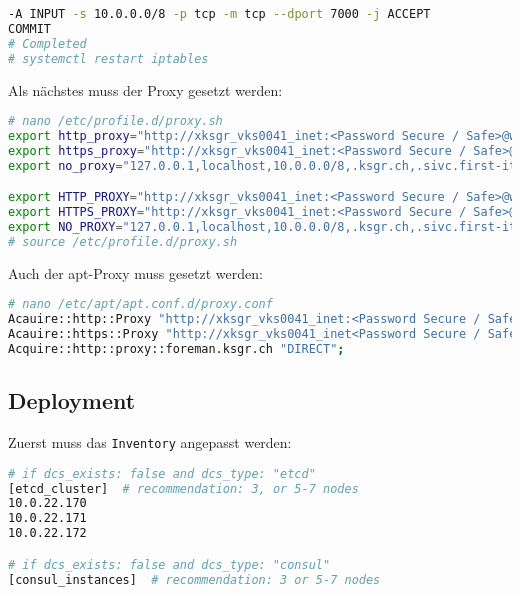 \begin{flushleft}
\begin{lstlisting}[language=bash, caption=Testsystem - Firewall Settings,captionpos=b,label={lst:testsystem-installation-firewall},breaklines=true]
-A INPUT -s 10.0.0.0/8 -p tcp -m tcp --dport 7000 -j ACCEPT
COMMIT
# Completed
# systemctl restart iptables
    \end{lstlisting}
    Als nächstes muss der Proxy gesetzt werden:
    \lstset{style=gra_codestyle}
    \begin{lstlisting}[language=bash, caption=Testsystem - Proxy Settings,captionpos=b,label={lst:testsystem-installation-proxy-settings},breaklines=true]
# nano /etc/profile.d/proxy.sh
export http_proxy="http://xksgr_vks0041_inet:<Password Secure / Safe>@webproxy.sivc.first-it.ch:9090";
export https_proxy="http://xksgr_vks0041_inet:<Password Secure / Safe>@webproxy.sivc.first-it.ch:9090";
export no_proxy="127.0.0.1,localhost,10.0.0.0/8,.ksgr.ch,.sivc.first-it.ch"

export HTTP_PROXY="http://xksgr_vks0041_inet:<Password Secure / Safe>@webproxy.sivc.first-it.ch:9090";
export HTTPS_PROXY="http://xksgr_vks0041_inet:<Password Secure / Safe>@webproxy.sivc.first-it.ch:9090";
export NO_PROXY="127.0.0.1,localhost,10.0.0.0/8,.ksgr.ch,.sivc.first-it.ch"
# source /etc/profile.d/proxy.sh
    \end{lstlisting}
    Auch der apt-Proxy muss gesetzt werden:
    \lstset{style=gra_codestyle}
    \begin{lstlisting}[language=bash, caption=Testsystem - apt-Proxy Settings,captionpos=b,label={lst:testsystem-installation-apt-proxy-settings},breaklines=true]
# nano /etc/apt/apt.conf.d/proxy.conf
Acauire::http::Proxy "http://xksgr_vks0041_inet:<Password Secure / Safe>@webproxy.sivc.first-it.ch:9090";
Acauire::https::Proxy "http://xksgr_vks0041_inet<Password Secure / Safe>@webproxy.sivc.first-it.ch:9090";
Acquire::http::proxy::foreman.ksgr.ch "DIRECT";
    \end{lstlisting}
    \subsection{Deployment}
    Zuerst muss das \texttt{Inventory} angepasst werden:
    \lstset{style=gra_codestyle}
    \begin{lstlisting}[language=bash, caption=Testsystem - Deployment - inventory,captionpos=b,label={lst:testsystem-deployment-inventory},breaklines=true]
# if dcs_exists: false and dcs_type: "etcd"
[etcd_cluster]  # recommendation: 3, or 5-7 nodes
10.0.22.170
10.0.22.171
10.0.22.172

# if dcs_exists: false and dcs_type: "consul"
[consul_instances]  # recommendation: 3 or 5-7 nodes


\end{lstlisting}
\end{flushleft}
